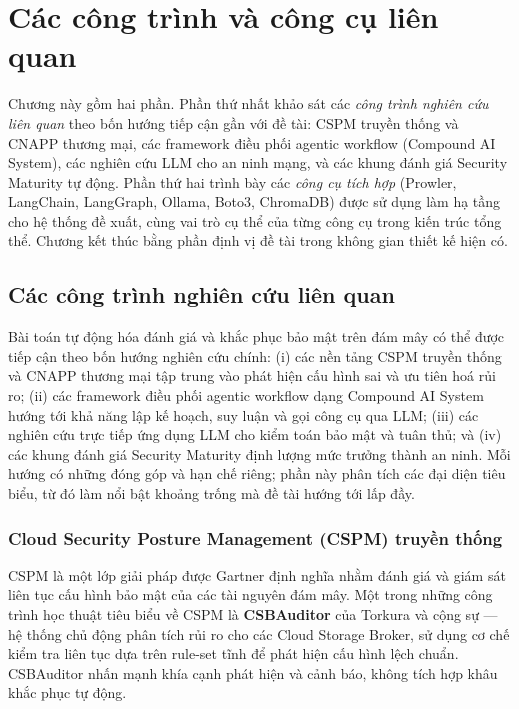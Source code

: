 \chapter{Các công trình và công cụ liên quan}

\newcommand{\yesmark}{\ding{51}}
\newcommand{\nomark}{\ding{55}}
\newcommand{\partialmark}{\ding{109}}

Chương này gồm hai phần. Phần thứ nhất khảo sát các \textit{công trình nghiên cứu liên quan} theo bốn hướng tiếp cận gần với đề tài: CSPM truyền thống và CNAPP thương mại, các framework điều phối agentic workflow (Compound AI System), các nghiên cứu LLM cho an ninh mạng, và các khung đánh giá Security Maturity tự động. Phần thứ hai trình bày các \textit{công cụ tích hợp} (Prowler, LangChain, LangGraph, Ollama, Boto3, ChromaDB) được sử dụng làm hạ tầng cho hệ thống đề xuất, cùng vai trò cụ thể của từng công cụ trong kiến trúc tổng thể. Chương kết thúc bằng phần định vị đề tài trong không gian thiết kế hiện có.

\section{Các công trình nghiên cứu liên quan}
\label{sec:related-research}

Bài toán tự động hóa đánh giá và khắc phục bảo mật trên đám mây có thể được tiếp cận theo bốn hướng nghiên cứu chính: (i) các nền tảng CSPM truyền thống và CNAPP thương mại tập trung vào phát hiện cấu hình sai và ưu tiên hoá rủi ro; (ii) các framework điều phối agentic workflow dạng Compound AI System hướng tới khả năng lập kế hoạch, suy luận và gọi công cụ qua LLM; (iii) các nghiên cứu trực tiếp ứng dụng LLM cho kiểm toán bảo mật và tuân thủ; và (iv) các khung đánh giá Security Maturity định lượng mức trưởng thành an ninh. Mỗi hướng có những đóng góp và hạn chế riêng; phần này phân tích các đại diện tiêu biểu, từ đó làm nổi bật khoảng trống mà đề tài hướng tới lấp đầy.

\subsection{Cloud Security Posture Management (CSPM) truyền thống}
\label{subsec:rw-cspm}

CSPM \cite{gartner_cspm} là một lớp giải pháp được Gartner định nghĩa nhằm đánh giá và giám sát liên tục cấu hình bảo mật của các tài nguyên đám mây. Một trong những công trình học thuật tiêu biểu về CSPM là \textbf{CSBAuditor} của Torkura và cộng sự \cite{torkura2019csbauditor} — hệ thống chủ động phân tích rủi ro cho các Cloud Storage Broker, sử dụng cơ chế kiểm tra liên tục dựa trên rule-set tĩnh để phát hiện cấu hình lệch chuẩn. CSBAuditor nhấn mạnh khía cạnh phát hiện và cảnh báo, không tích hợp khâu khắc phục tự động.

